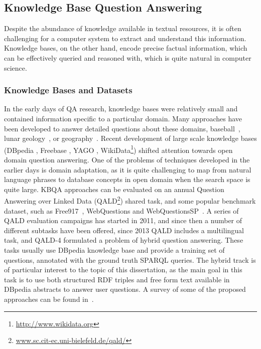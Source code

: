 \subsection{Knowledge Base Question Answering}
\label{section:relatedwork:factoid:kbqa}

Despite the abundance of knowledge available in textual resources, it is often challenging for a computer system to extract and understand this information.
Knowledge bases, on the other hand, encode precise factual information, which can be effectively queried and reasoned with, which is quite natural in computer science.

\subsubsection{Knowledge Bases and Datasets}
\label{section:relatedwork:factoid:kbqa:data}

In the early days of QA research, knowledge bases were relatively small and contained information specific to a particular domain.
Many approaches have been developed to answer detailed questions about these domains, \eg baseball~\cite{green1961baseball}, lunar geology~\cite{woods1977lunar}, or geography~\cite{zelle1996learning}.
Recent development of large scale knowledge bases (\eg DBpedia \cite{auer2007dbpedia}, Freebase \cite{Bollacker:2008:FCC:1376616.1376746}, YAGO \cite{suchanek2007yago}, WikiData\footnote{\href{url}{http://www.wikidata.org}}) shifted attention towards open domain question answering.
One of the problems of techniques developed in the earlier days is domain adaptation, as it is quite challenging to map from natural language phrases to database concepts in open domain when the search space is quite large.
KBQA approaches can be evaluated on an annual Question Answering over Linked Data (QALD\footnote{\href{url}{www.sc.cit-ec.uni-bielefeld.de/qald/}}) shared task, and some popular benchmark dataset, such as Free917~\cite{CaiY13}, WebQuestions \cite{BerantCFL13:sempre} and WebQuestionsSP~\cite{yih2016webquestionssp}.
A series of QALD evaluation campaigns has started in 2011, and since then a number of different subtasks have been offered, \ie since 2013 QALD includes a multilingual task, and QALD-4 formulated a problem of hybrid question answering.
These tasks usually use DBpedia knowledge base and provide a training set of questions, annotated with the ground truth SPARQL queries.
The hybrid track is of particular interest to the topic of this dissertation, as the main goal in this task is to use both structured RDF triples and free form text available in DBpedia abstracts to answer user questions.
A survey of some of the proposed approaches can be found in~\cite{unger2014introduction}.

